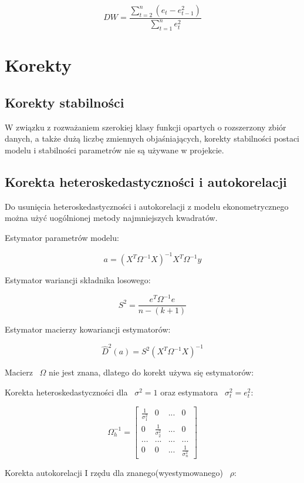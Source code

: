 \documentclass{article}
\begin{document}
\[DW = \frac{\sum_{t=2}^{n} (e_t-e_{t-1}^2)}{\sum_{t=1}^{n}e_t^2}\]

\newpage
\section{Korekty}

\subsection{Korekty stabilności}
W związku z rozważaniem szerokiej klasy funkcji opartych o rozszerzony zbiór danych, a także dużą liczbę zmiennych objaśniających, korekty stabilności postaci modelu i stabilności parametrów nie są używane w projekcie.

\subsection{Korekta heteroskedastyczności i autokorelacji}
Do usunięcia heteroskedastyczności i autokorelacji z modelu ekonometrycznego można użyć uogólnionej metody najmniejszych kwadratów.

Estymator parametrów modelu:

\[a = (X^T\Omega^{-1}X)^{-1}X^T\Omega^{-1}y\]

Estymator wariancji składnika losowego:

\[S^2=\frac{e^T\Omega^{-1}e}{n - (k+1)}\]

Estymator macierzy kowariancji estymatorów:

\[\hat{D}^2(a)=S^2(X^T\Omega^{-1}X)^{-1}\]

Macierz ~$\Omega$ nie jest znana, dlatego do korekt używa się estymatorów:

Korekta heteroskedastyczności dla ~$\sigma^2 = 1$ oraz estymatora ~$\sigma_t^2=e_t^2$:

\begin{equation*}
    \Omega_{h}^{-1}=
    \begin{bmatrix}
        \frac{1}{\sigma_1^2} & 0 & ... & 0 \\
        0 & \frac{1}{\sigma_2^2} & ... & 0 \\
        ... & ... & ... & ... \\
        0 & 0 & ... & \frac{1}{\sigma_n^2}
    \end{bmatrix}
\end{equation*}

Korekta autokorelacji I rzędu dla znanego(wyestymowanego) ~$\rho$:
\end{document}
